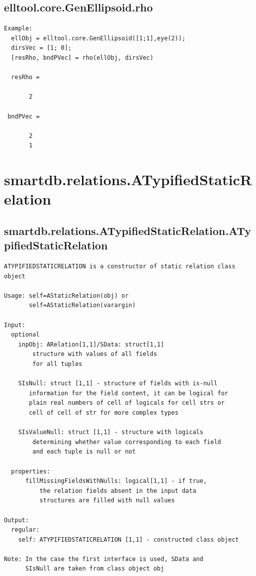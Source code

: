 \documentclass[letterpaper,10pt,english]{sphinxmanual}
\begin{document}
\subsection{elltool.core.GenEllipsoid.rho}
\label{chap_functions:elltool-core-genellipsoid-rho}
\begin{Verbatim}[commandchars=\\\{\}]
Example:
  ellObj = elltool.core.GenEllipsoid([1;1],eye(2));
  dirsVec = [1; 0];
  [resRho, bndPVec] = rho(ellObj, dirsVec)

  resRho =

       2

 bndPVec =

       2
       1
\end{Verbatim}


\section{smartdb.relations.ATypifiedStaticRelation}
\label{chap_functions:smartdb-relations-atypifiedstaticrelation}

\subsection{smartdb.relations.ATypifiedStaticRelation.ATypifiedStaticRelation}
\label{chap_functions:smartdb-relations-atypifiedstaticrelation-atypifiedstaticrelation}
\begin{Verbatim}[commandchars=\\\{\}]
ATYPIFIEDSTATICRELATION is a constructor of static relation class
object

Usage: self=AStaticRelation(obj) or
       self=AStaticRelation(varargin)

Input:
  optional
    inpObj: ARelation[1,1]/SData: struct[1,1]
        structure with values of all fields
        for all tuples

    SIsNull: struct [1,1] - structure of fields with is-null
       information for the field content, it can be logical for
       plain real numbers of cell of logicals for cell strs or
       cell of cell of str for more complex types

    SIsValueNull: struct [1,1] - structure with logicals
        determining whether value corresponding to each field
        and each tuple is null or not

  properties:
      fillMissingFieldsWithNulls: logical[1,1] - if true,
          the relation fields absent in the input data
          structures are filled with null values

Output:
  regular:
    self: ATYPIFIEDSTATICRELATION [1,1] - constructed class object

Note: In the case the first interface is used, SData and
      SIsNull are taken from class object obj
\end{Verbatim}
\end{document}
